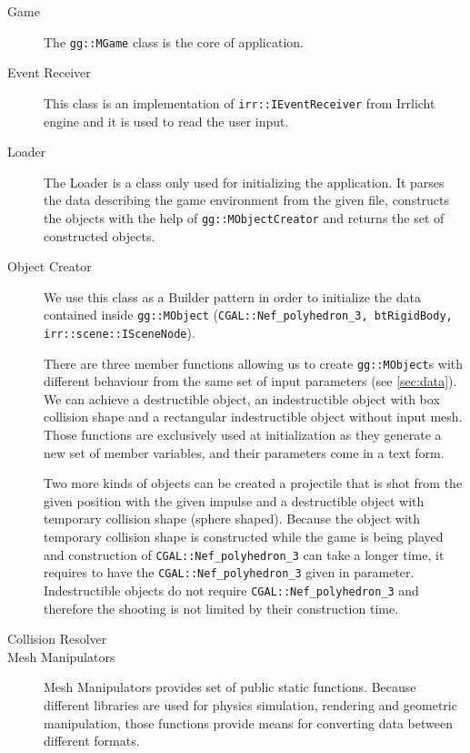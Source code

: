 \begin{description}
\item[Game]
The {\tt gg::MGame} class is the core of application. 

\item[Event Receiver]
This class is an implementation of {\tt irr::IEventReceiver} from Irrlicht engine and it is used to read the user input.

\item[Loader]
The Loader is a class only used for initializing the application. It parses the data describing the game environment from the given file, constructs the objects with the help of {\tt gg::MObjectCreator} and returns the set of constructed objects.

\item[Object Creator]
We use this class as a Builder pattern in order to initialize the data contained inside {\tt gg::MObject} ({\tt CGAL::Nef\_polyhedron\_3, btRigidBody, irr::scene::ISceneNode}).

There are three member functions allowing us to create {\tt gg::MObject}s  with different behaviour from the same set of input parameters (see \cref{sec:data}). We can achieve a destructible object, an indestructible object with box collision shape and a rectangular indestructible object without input mesh. Those functions are exclusively used at initialization as they generate a new set of member variables, and their parameters come in a text form.

Two more kinds of objects can be created a projectile that is shot from the given position with the given impulse and a destructible object with temporary collision shape (sphere shaped). Because the object with temporary collision shape is constructed while the game is being played and construction of {\tt CGAL::Nef\_polyhedron\_3} can take a longer time, it requires to have the {\tt CGAL::Nef\_polyhedron\_3} given in parameter. Indestructible objects do not require {\tt CGAL::Nef\_polyhedron\_3}  and therefore the shooting is not limited by their construction time.

\item[Collision Resolver]

\item[Mesh Manipulators]
Mesh Manipulators provides set of public static functions. Because different libraries are used for physics simulation, rendering and geometric manipulation, those functions provide means for converting data between different formats.
\end{description}



